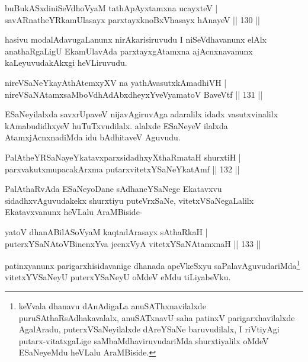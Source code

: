 \begin{shl}
buBukASxdiniSeVdhoV\s yaM tathA\s pAyxtamxna ucayxteV |\\
savARnatheYRkamUlasayx parxtayxknoBxVhasayx hAnayeV \hfill || 130 ||
\end{shl}

\begin{artha}
hasivu modalAdavugaLanunx nirAkarisiruvudu I niSeVdhavanunx elAlx anathaRgaLigU EkamUlavAda parxtayxgAtamxna ajAcnxnavanunx kaLeyuvudakAkxgi heVLiruvudu.
\end{artha}

\begin{shl}
nireVSaNeYkayAthAtemxyXV na yathAvasutxkAmadhiVH |\\
nireVSaNAtamxsaMboVdhAdAbxdheyxYveVyamatoV BaveVtf \hfill || 131 ||
\end{shl}

\begin{artha}
ESaNeyilalxda savxrUpaveV nijavAgiruvAga adaralilx idadx vasutxvinalilx kAmabudidhxyeV huTuTxvudilalx. alalxde ESaNeyeV ilalxda AtamxjAcnxnadiMda idu bAdhitaveV Aguvudu.
\end{artha}

\begin{shl}
PalAtheYRSaNayeYkatavxparxsidadhxyXthaRmataH shurxtiH |\\
parxvakutxmupacakArxma putarxvitetxYSaNeYkatAmf \hfill || 132 ||
\end{shl}

\begin{artha}
PalAthaRvAda ESaNeyoDane sAdhaneYSaNege Ekatavxvu sidadhxvAguvudakekx shurxtiyu puteVrxSaNe, vitetxVSaNegaLalilx Ekatavxvanunx heVLalu AraMBiside-
\end{artha}


\begin{shl}
yatoV dhanABilASoV\s yaM kaqtadArasayx sAthaRkaH |\\
puterxYSaNA\s toV\s BinenxYva jecnxVyA vitetxYSaNAtamxnaH \hfill || 133 ||
\end{shl}

\begin{artha}
patinxyanunx parigarxhisidavanige dhanada apeVkeSxyu saPalavAguvudariMda\footnote{keVvala dhanavu dAnAdigaLa anuSAThxnavilalxde puruSAthaRsAdhakavalalx, anuSATxnavU saha patinxV parigarxhavilalxde AgalAradu, puterxVSaNeyilalxde dAreYSaNe baruvudilalx, I riVtiyAgi putarx-vitatxgaLige saMbaMdhaviruvudariMda shurxtiyalilx oMdeV ESaNeyeMdu heVLalu AraMBiside.} vitetxYVSaNeyU puterxYSaNeyU oMdeV eMdu tiLiyabeVku.
\end{artha}

